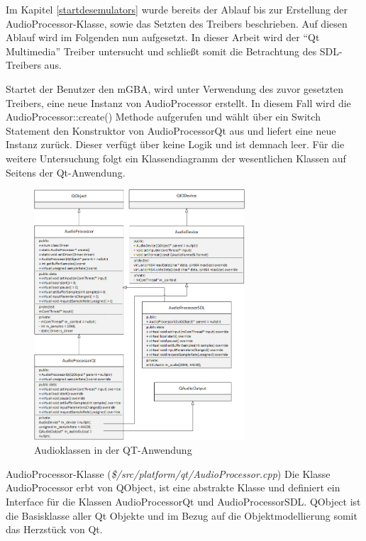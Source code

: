 \documentclass[11pt,a4paper]{scrartcl}
\begin{document}
Im Kapitel  \ref{startdesemulators} wurde bereits der Ablauf bis zur Erstellung der AudioProcessor-Klasse, sowie das Setzten des Treibers beschrieben. Auf diesen Ablauf wird im Folgenden nun aufgesetzt. In dieser Arbeit
wird der \enquote{Qt Multimedia} Treiber untersucht und schlie{\ss}t somit die Betrachtung des SDL-Treibers aus.

Startet der Benutzer den mGBA, wird unter Verwendung des zuvor gesetzten Treibers, eine neue Instanz von AudioProcessor erstellt. In diesem Fall wird die AudioProcessor::create() Methode aufgerufen und w\"ahlt \"uber ein Switch Statement den Konstruktor von AudioProcessorQt aus und liefert eine neue Instanz zur\"uck. Dieser verf\"ugt \"uber keine Logik und ist demnach leer. F\"ur die weitere Untersuchung folgt ein Klassendiagramm der wesentlichen Klassen auf Seitens der Qt-Anwendung.

\begin{figure}[h!]
    \centering
    \includegraphics[width=0.7\textwidth]{QT_Klassendiagramm}
    \caption{Audioklassen in der QT-Anwendung}
    \label{fig:qtclassdiagramm}
\end{figure}

\newpage

\vspace{5mm}
\large AudioProcessor-Klasse \normalsize(\textit{\$/src/platform/qt/AudioProcessor.cpp})
\vspace{2mm}\newline
Die Klasse AudioProcessor erbt von QObject, ist eine abstrakte Klasse und definiert ein Interface f\"ur die Klassen AudioProcessorQt und AudioProcessorSDL. QObject ist die Basisklasse aller Qt Objekte und im Bezug auf
die Objektmodellierung somit das Herzst\"uck von Qt. 
\end{document}
